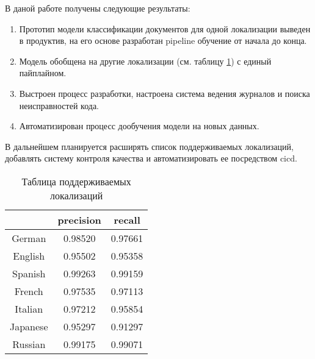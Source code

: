 
\conclusion

В даной работе получены следующие результаты:

\begin{enumerate}
    \item Прототип модели классификации документов для одной локализации выведен в продуктив, на его основе разработан \gls{pipeline} обучение от начала до конца.
    \item Модель обобщена на другие локализации (см. таблицу \ref{table:supported_locales}) с единый пайплайном.
    \item Выстроен процесс разработки, настроена система ведения журналов и поиска неисправностей кода.
    \item Автоматизирован процесс дообучения модели на новых данных.
\end{enumerate}

В дальнейшем планируется расширять список поддерживаемых локализаций, добавлять систему контроля качества и автоматизировать ее посредством \gls{cicd}.

\begin{table}[h]
    \centering
    \begin{tabular}{|c|c|c|}
        \hline
                 & precision & recall  \\ \hline
        German   & 0.98520   & 0.97661 \\ \hline
        English  & 0.95502   & 0.95358 \\ \hline
        Spanish  & 0.99263   & 0.99159 \\ \hline
        French   & 0.97535   & 0.97113 \\ \hline
        Italian  & 0.97212   & 0.95854 \\ \hline
        Japanese & 0.95297   & 0.91297 \\ \hline
        Russian  & 0.99175   & 0.99071 \\ \hline
    \end{tabular}
    \caption{Таблица поддерживаемых локализаций}
    \label{table:supported_locales}
\end{table}
